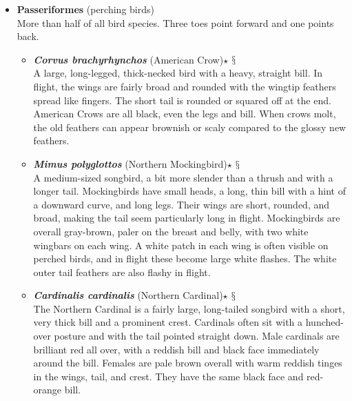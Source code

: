\documentclass[a4paper,12pt]{article}
\begin{document}
\begin{description}
\begin{itemize}
\begin{itemize}
\begin{itemize}
    \end{itemize}
    \item {\textbf{Passeriformes} (perching birds)} \\ More than half of all bird species. Three toes point forward and one points back.
    \begin{itemize}
      \item{\textbf{\textit{Corvus brachyrhynchos}} (American Crow)$\star$ $\mathsection$} \\ A large, long-legged, thick-necked bird with a heavy, straight bill. In flight, the wings are fairly broad and rounded with the wingtip feathers spread like fingers. The short tail is rounded or squared off at the end. American Crows are all black, even the legs and bill. When crows molt, the old feathers can appear brownish or scaly compared to the glossy new feathers.
      \item{\textbf{\textit{Mimus polyglottos}} (Northern Mockingbird)$\star$ $\mathsection$} \\ A medium-sized songbird, a bit more slender than a thrush and with a longer tail. Mockingbirds have small heads, a long, thin bill with a hint of a downward curve, and long legs. Their wings are short, rounded, and broad, making the tail seem particularly long in flight. Mockingbirds are overall gray-brown, paler on the breast and belly, with two white wingbars on each wing. A white patch in each wing is often visible on perched birds, and in flight these become large white flashes. The white outer tail feathers are also flashy in flight.
      \item{\textbf{\textit{Cardinalis cardinalis}} (Northern Cardinal)$\star$ $\mathsection$} \\ The Northern Cardinal is a fairly large, long-tailed songbird with a short, very thick bill and a prominent crest. Cardinals often sit with a hunched-over posture and with the tail pointed straight down. Male cardinals are brilliant red all over, with a reddish bill and black face immediately around the bill. Females are pale brown overall with warm reddish tinges in the wings, tail, and crest. They have the same black face and red-orange bill.
    \end{itemize}
  \end{itemize}
\end{itemize}
\end{description}
\end{document}

